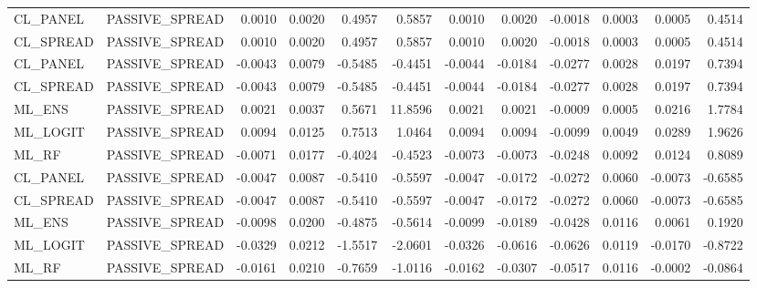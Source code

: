 \begin{table}
\begin{tabular}{llrrrrrrrrrr}
CL_PANEL & PASSIVE_SPREAD & 0.0010 & 0.0020 & 0.4957 & 0.5857 & 0.0010 & 0.0020 & -0.0018 & 0.0003 & 0.0005 & 0.4514 \\
CL_SPREAD & PASSIVE_SPREAD & 0.0010 & 0.0020 & 0.4957 & 0.5857 & 0.0010 & 0.0020 & -0.0018 & 0.0003 & 0.0005 & 0.4514 \\
CL_PANEL & PASSIVE_SPREAD & -0.0043 & 0.0079 & -0.5485 & -0.4451 & -0.0044 & -0.0184 & -0.0277 & 0.0028 & 0.0197 & 0.7394 \\
CL_SPREAD & PASSIVE_SPREAD & -0.0043 & 0.0079 & -0.5485 & -0.4451 & -0.0044 & -0.0184 & -0.0277 & 0.0028 & 0.0197 & 0.7394 \\
ML_ENS & PASSIVE_SPREAD & 0.0021 & 0.0037 & 0.5671 & 11.8596 & 0.0021 & 0.0021 & -0.0009 & 0.0005 & 0.0216 & 1.7784 \\
ML_LOGIT & PASSIVE_SPREAD & 0.0094 & 0.0125 & 0.7513 & 1.0464 & 0.0094 & 0.0094 & -0.0099 & 0.0049 & 0.0289 & 1.9626 \\
ML_RF & PASSIVE_SPREAD & -0.0071 & 0.0177 & -0.4024 & -0.4523 & -0.0073 & -0.0073 & -0.0248 & 0.0092 & 0.0124 & 0.8089 \\
CL_PANEL & PASSIVE_SPREAD & -0.0047 & 0.0087 & -0.5410 & -0.5597 & -0.0047 & -0.0172 & -0.0272 & 0.0060 & -0.0073 & -0.6585 \\
CL_SPREAD & PASSIVE_SPREAD & -0.0047 & 0.0087 & -0.5410 & -0.5597 & -0.0047 & -0.0172 & -0.0272 & 0.0060 & -0.0073 & -0.6585 \\
ML_ENS & PASSIVE_SPREAD & -0.0098 & 0.0200 & -0.4875 & -0.5614 & -0.0099 & -0.0189 & -0.0428 & 0.0116 & 0.0061 & 0.1920 \\
ML_LOGIT & PASSIVE_SPREAD & -0.0329 & 0.0212 & -1.5517 & -2.0601 & -0.0326 & -0.0616 & -0.0626 & 0.0119 & -0.0170 & -0.8722 \\
ML_RF & PASSIVE_SPREAD & -0.0161 & 0.0210 & -0.7659 & -1.0116 & -0.0162 & -0.0307 & -0.0517 & 0.0116 & -0.0002 & -0.0864 \\
\bottomrule
\end{tabular}
\end{table}
